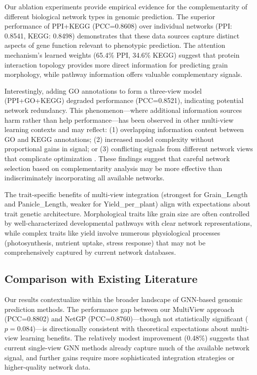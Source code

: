 \documentclass[11pt,a4paper]{article}
\begin{document}
Our ablation experiments provide empirical evidence for the complementarity of different biological network types in genomic prediction. The superior performance of PPI+KEGG (PCC=0.8608) over individual networks (PPI: 0.8541, KEGG: 0.8498) demonstrates that these data sources capture distinct aspects of gene function relevant to phenotypic prediction. The attention mechanism's learned weights (65.4\% PPI, 34.6\% KEGG) suggest that protein interaction topology provides more direct information for predicting grain morphology, while pathway information offers valuable complementary signals.

Interestingly, adding GO annotations to form a three-view model (PPI+GO+KEGG) degraded performance (PCC=0.8521), indicating potential network redundancy. This phenomenon—where additional information sources harm rather than help performance—has been observed in other multi-view learning contexts and may reflect: (1) overlapping information content between GO and KEGG annotations; (2) increased model complexity without proportional gains in signal; or (3) conflicting signals from different network views that complicate optimization \citep{xu2013survey}. These findings suggest that careful network selection based on complementarity analysis may be more effective than indiscriminately incorporating all available networks.

The trait-specific benefits of multi-view integration (strongest for Grain\_Length and Panicle\_Length, weaker for Yield\_per\_plant) align with expectations about trait genetic architecture. Morphological traits like grain size are often controlled by well-characterized developmental pathways with clear network representations, while complex traits like yield involve numerous physiological processes (photosynthesis, nutrient uptake, stress response) that may not be comprehensively captured by current network databases.

\subsection{Comparison with Existing Literature}
\label{subsec:lit_comparison}

Our results contextualize within the broader landscape of GNN-based genomic prediction methods. The performance gap between our MultiView approach (PCC=0.8802) and NetGP (PCC=0.8760)—though not statistically significant ($p=0.084$)—is directionally consistent with theoretical expectations about multi-view learning benefits. The relatively modest improvement (0.48\%) suggests that current single-view GNN methods already capture much of the available network signal, and further gains require more sophisticated integration strategies or higher-quality network data.
\end{document}
